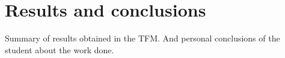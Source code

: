 \chapter{Results and conclusions}

Summary of results obtained in the TFM. And personal conclusions of the student about the work done.

